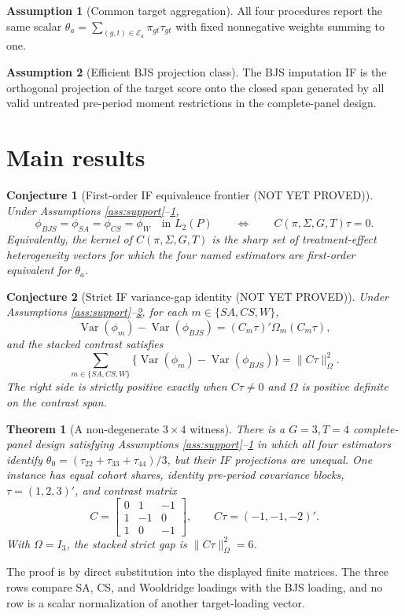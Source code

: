 \documentclass[11pt]{article}
\theoremstyle{definition}
\newtheorem{assumption}{Assumption}
\theoremstyle{plain}
\newtheorem{theorem}{Theorem}
\newtheorem{conjecture}{Conjecture}
\theoremstyle{remark}
\begin{document}
\begin{assumption}[Common target aggregation]\label{ass:common-target}
All four procedures report the same scalar $\theta_a=\sum_{(g,t)\in\mathcal{E}_a}\pi_{gt}\tau_{gt}$ with fixed nonnegative weights summing to one.
\end{assumption}

\begin{assumption}[Efficient BJS projection class]\label{ass:bjs-class}
The BJS imputation IF is the orthogonal projection of the target score onto the closed span generated by all valid untreated pre-period moment restrictions in the complete-panel design.
\end{assumption}

\section{Main results}
\begin{conjecture}[First-order IF equivalence frontier (NOT YET PROVED)]\label{conj:frontier}
Under Assumptions \ref{ass:support}--\ref{ass:common-target},
\[
\phi_{BJS}=\phi_{SA}=\phi_{CS}=\phi_W\quad\text{in }L_2(P)
\qquad\Longleftrightarrow\qquad
C(\pi,\Sigma,G,T)\tau=0.
\]
Equivalently, the kernel of $C(\pi,\Sigma,G,T)$ is the sharp set of treatment-effect heterogeneity vectors for which the four named estimators are first-order equivalent for $\theta_a$.
\end{conjecture}

\begin{conjecture}[Strict IF variance-gap identity (NOT YET PROVED)]\label{conj:gap}
Under Assumptions \ref{ass:support}--\ref{ass:bjs-class}, for each $m\in\{SA,CS,W\}$,
\[
\operatorname{Var}(\phi_m)-\operatorname{Var}(\phi_{BJS})=(C_m\tau)'\Omega_m(C_m\tau),
\]
and the stacked contrast satisfies
\[
\sum_{m\in\{SA,CS,W\}}\{\operatorname{Var}(\phi_m)-\operatorname{Var}(\phi_{BJS})\}=\|C\tau\|^2_{\Omega}.
\]
The right side is strictly positive exactly when $C\tau\neq0$ and $\Omega$ is positive definite on the contrast span.
\end{conjecture}

\begin{theorem}[A non-degenerate $3\times4$ witness]\label{thm:witness}
There is a $G=3,T=4$ complete-panel design satisfying Assumptions \ref{ass:support}--\ref{ass:common-target} in which all four estimators identify $\theta_0=(\tau_{22}+\tau_{33}+\tau_{44})/3$, but their IF projections are unequal. One instance has equal cohort shares, identity pre-period covariance blocks, $\tau=(1,2,3)'$, and contrast matrix
\[
C=\begin{bmatrix}
0&1&-1\\
1&-1&0\\
1&0&-1
\end{bmatrix},
\qquad
C\tau=(-1,-1,-2)'.
\]
With $\Omega=I_3$, the stacked strict gap is $\|C\tau\|_\Omega^2=6$.
\end{theorem}
The proof is by direct substitution into the displayed finite matrices. The three rows compare SA, CS, and Wooldridge loadings with the BJS loading, and no row is a scalar normalization of another target-loading vector.
\end{document}

